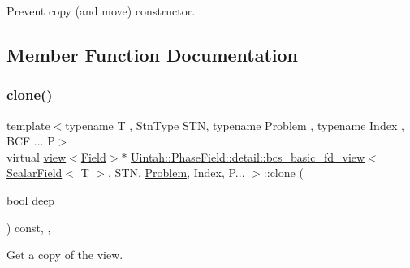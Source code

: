 Prevent copy (and move) constructor. 



\subsection{Member Function Documentation}
\mbox{\label{classUintah_1_1PhaseField_1_1detail_1_1bcs__basic__fd__view_3_01ScalarField_3_01T_01_4_00_01STN_07caa9955adf783da0505eac75e76f08_a5f5cdae9c3953834dfc8167e5ac9dafb}} 
\subsubsection{\texorpdfstring{clone()}{clone()}\hspace{0.1cm}{\footnotesize\ttfamily [1/2]}}
{\footnotesize\ttfamily template$<$typename T , Stn\+Type S\+TN, typename Problem , typename Index , B\+C\+F ... P$>$ \\
virtual \hyperlink{classUintah_1_1PhaseField_1_1detail_1_1view}{view}$<$\hyperlink{structUintah_1_1PhaseField_1_1ScalarField}{Field}$>$$\ast$ \hyperlink{classUintah_1_1PhaseField_1_1detail_1_1bcs__basic__fd__view}{Uintah\+::\+Phase\+Field\+::detail\+::bcs\+\_\+basic\+\_\+fd\+\_\+view}$<$ \hyperlink{structUintah_1_1PhaseField_1_1ScalarField}{Scalar\+Field}$<$ T $>$, S\+TN, \hyperlink{classUintah_1_1PhaseField_1_1Problem}{Problem}, Index, P... $>$\+::clone (\begin{DoxyParamCaption}\item[{bool}]{deep }\end{DoxyParamCaption}) const\hspace{0.3cm}{\ttfamily [inline]}, {\ttfamily [override]}, {\ttfamily [virtual]}}



Get a copy of the view. 


